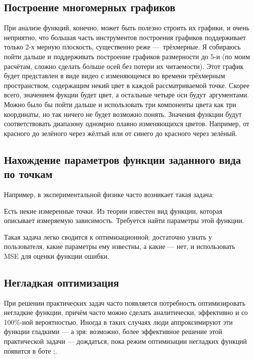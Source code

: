 \documentclass[11pt]{article}
\begin{document}
    \subsection{Построение многомерных графиков}
    При анализе функций, конечно, может быть полезно строить их графики, и очень неприятно,
    что большая часть инструментов построения графиков поддерживает только 2-х мерную плоскость,
    существенно реже — трёхмерные.
    Я собираюсь пойти дальше и поддерживать построение графиков размерности до 5-и (по моим расчётам, сложно сделать больше осей без потери их читаемости).
    Этот график будет представлен в виде видео с изменяющемся во времени трёхмерным пространством, содержащим некий цвет в каждой рассматриваемой точке.
    Скорее всего, значением фукции будет цвет, а остальные четыре оси будут аргументами.
    Можно было бы пойти дальше и использовать три компоненты цвета как три координаты, но так ничего не будет возможно понять.
    Значения функции будут соответствовать диапазону одномрно плавно изменяющихся цветов.
    Например, от красного до зелёного через жёлтый или от синего до красного через зелёный.

    \subsection{Нахождение параметров функции заданного вида по точкам}
    Например, в экспериментальной физике часто возникает такая задача:

    Есть некие измеренные точки.
    Из теории известен вид функции, которая описывает измеряемую зависимость.
    Требуется найти параметры этой функции.

    Такая задача легко сводится к оптимизационной: достаточно узнать у пользователя, какие параметры ему известны,
    а какие — нет, и использовать MSE для оценки функции ошибки.

    \subsection{Негладкая оптимизация}
    При решении практических задач часто появляется потребность оптимизировать негладкие функции,
    причём часто можно сделать аналитически, эффективно и со 100\%-ной вероятностью.
    Иногда в таких случаях люди аппроксимируют эти функции гладкими — а зря:
    возможно, более эффективное решение этой практической задачи — дождаться,
    пока режим оптимизации негладких функций появится в боте ;\).
\end{document}
